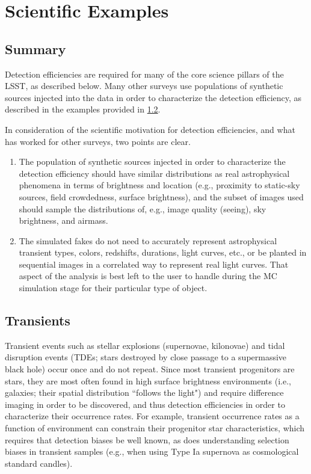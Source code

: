 \section{Scientific Examples}\label{sec:sci}

\subsection{Summary}

Detection efficiencies are required for many of the core science pillars of the LSST, as described below.
Many other surveys use populations of synthetic sources injected into the data in order to characterize the detection efficiency, as described in the examples provided in \ref{ssec:sci_trans}.

In consideration of the scientific motivation for detection efficiencies, and what has worked for other surveys, two points are clear.

\begin{enumerate}

\item The population of synthetic sources injected in order to characterize the detection efficiency should have similar distributions as real astrophysical phenomena in terms of brightness and location (e.g., proximity to static-sky sources, field crowdedness, surface brightness), and the subset of images used should sample the distributions of, e.g., image quality (seeing), sky brightness, and airmass. 

\item The simulated fakes do not need to accurately represent astrophysical transient types, colors, redshifts, durations, light curves, etc., or be planted in sequential images in a correlated way to represent real light curves.
That aspect of the analysis is best left to the user to handle during the MC simulation stage for their particular type of object.

\end{enumerate}

\subsection{Transients}\label{ssec:sci_trans}

Transient events such as stellar explosions (supernovae, kilonovae) and tidal disruption events (TDEs; stars destroyed by close passage to a supermassive black hole) occur once and do not repeat.
Since most transient progenitors are stars, they are most often found in high surface brightness environments (i.e., galaxies; their spatial distribution ``follows the light") and require difference imaging in order to be discovered, and thus detection efficiencies in order to characterize their occurrence rates.
For example, transient occurrence rates as a function of environment can constrain their progenitor star characteristics, which requires that detection biases be well known, as does understanding selection biases in transient samples (e.g., when using Type Ia supernova as cosmological standard candles). 

